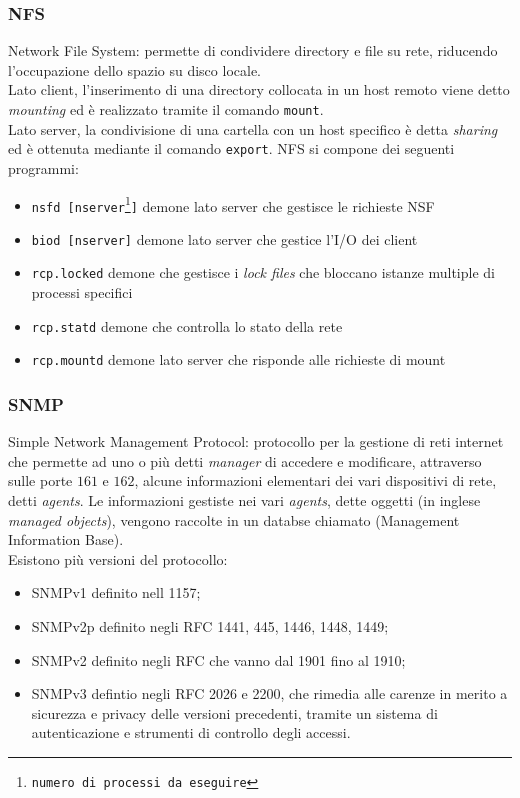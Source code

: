 \documentclass[a4paper,11pt]{article}
\def\code#1{\texttt{#1}}
\def\subsub#1{\subsubsection{#1}\label{#1}}
\def\vedi#1{\nameref{#1}}
\def\italic#1{\textit{#1}}
\begin{document}
\subsub{NFS}
Network File System: permette di condividere directory e file su rete, riducendo l'occupazione dello spazio su disco locale.\\Lato client, l'inserimento di una directory collocata in un host remoto viene detto \italic{mounting} ed è realizzato tramite il comando \code{mount}.\\
Lato server, la condivisione di una cartella con un host specifico è detta \italic{sharing} ed è ottenuta mediante il comando \code{export}.
NFS si compone dei seguenti programmi:
\begin{itemize}
\item \code{nsfd [nserver\footnote{numero di processi da eseguire}]} demone lato server  che gestisce le richieste NSF
\item \code{biod [nserver]} demone lato server che gestice l'I/O dei client
\item \code{rcp.locked} demone che gestisce i \italic{lock files} che bloccano istanze multiple di processi specifici
\item \code{rcp.statd} demone che controlla lo stato della rete
\item \code{rcp.mountd} demone lato server che risponde alle richieste di mount
\end{itemize} 
\subsub{SNMP}  %
Simple Network Management Protocol: protocollo per la gestione di reti internet che permette ad uno o più \vedi{DTE} detti \italic{manager} di accedere e modificare, attraverso \vedi{UDP} sulle porte $161$ e $162$, alcune informazioni elementari dei vari dispositivi di rete, detti \italic{agents}. Le informazioni gestiste nei vari \italic{agents}, dette 
oggetti (in inglese \italic{managed objects}), vengono raccolte in un databse chiamato \vedi{MIB} (Management Information Base).
\\Esistono più versioni del protocollo:
\begin{itemize}
\item SNMPv1 definito nell \vedi{RFC} 1157;
\item SNMPv2p definito negli RFC 1441, 445, 1446, 1448, 1449;
\item SNMPv2 definito negli RFC che vanno dal 1901 fino al 1910;
\item SNMPv3 defintio negli RFC 2026 e 2200, che rimedia alle carenze in merito a sicurezza e privacy delle versioni precedenti, tramite un sistema di autenticazione e strumenti di controllo degli accessi.
\end{itemize}
\end{document}
